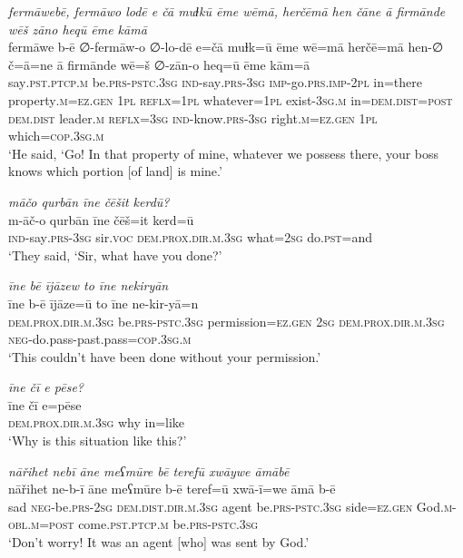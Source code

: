 \ea \label{PM.20}
\textit{fermāwebē, fermāwo lodē e čā muɫkū ēme wēmā, herčēmā hen čāne ā firmānde wēš zāno heqū ēme kāmā} \\ 
\gll fermāwe b-ē ∅-fermāw-o ∅-lo-dē e=čā muɫk=ū ēme wē=mā herčē=mā hen-∅ č=ā=ne ā firmānde wē=š ∅-zān-o heq=ū ēme kām=ā \\ 
 say\textsc{.pst}\textsc{.ptcp}\textsc{.m} be\textsc{.prs}\textsc{-pstc}\textsc{.3sg} \textsc{ind-}say\textsc{.prs}\textsc{-3sg} \textsc{imp-}go\textsc{.prs}.\textsc{imp-}\textsc{2pl} in=there property\textsc{.m}\textsc{\textsc{=ez.gen}} \textsc{1pl} \textsc{reflx}\textsc{=1pl} whatever\textsc{=1pl} exist\textsc{-3sg}\textsc{.m} in=\textsc{dem.dist}\textsc{=\textsc{post}} \textsc{dem.dist} leader\textsc{.m} \textsc{reflx}\textsc{=3sg} \textsc{ind-}know\textsc{.prs}\textsc{-3sg} right\textsc{.m}\textsc{\textsc{=ez.gen}} \textsc{1pl} which\textsc{=cop}\textsc{.3sg}\textsc{.m} \\ 
\glt `He said, ‘Go! In that property of mine, whatever we possess there, your boss knows which portion [of land] is mine.'
\z 
 
\ea \label{PM.29}
\textit{māčo qurbān īne čēšit kerdū?} \\ 
\gll m-āč-o qurbān īne čēš=it kerd=ū \\ 
 \textsc{ind-}say\textsc{.prs}\textsc{-3sg} sir.\textsc{voc} \textsc{dem.prox}\textsc{.dir}\textsc{.m}\textsc{.3sg} what\textsc{=\textsc{2sg}} do\textsc{.pst}=and \\ 
\glt `They said, ‘Sir, what have you done?'
\z 
 
\ea \label{PM.30}
\textit{īne bē ījāzew to īne nekiryān} \\ 
\gll īne b-ē ījāze=ū to īne ne-kir-yā=n \\ 
 \textsc{dem.prox}\textsc{.dir}\textsc{.m}\textsc{.3sg} be\textsc{.prs}\textsc{-pstc}\textsc{.3sg} permission\textsc{\textsc{=ez.gen}} \textsc{2sg} \textsc{dem.prox}\textsc{.dir}\textsc{.m}\textsc{.3sg} \textsc{neg-}do.pass-past.pass\textsc{=cop}\textsc{.3sg}\textsc{.m} \\ 
\glt `This couldn’t have been done without your permission.'
\z 
 
\ea \label{PM.32}
\textit{īne čī e pēse?} \\ 
\gll īne čī e=pēse \\ 
 \textsc{dem.prox}\textsc{.dir}\textsc{.m}\textsc{.3sg} why in=like \\ 
\glt `Why is this situation like this?'
\z 
 
\ea \label{PM.34}
\textit{nāřihet nebī āne meʕmūre bē terefū xwāywe āmābē} \\ 
\gll nāřihet ne-b-ī āne meʕmūre b-ē teref=ū xwā-ī=we āmā b-ē \\ 
 sad \textsc{neg-}be\textsc{.prs}-\textsc{2sg} \textsc{dem.dist}\textsc{.dir}\textsc{.m}\textsc{.3sg} agent be\textsc{.prs}\textsc{-pstc}\textsc{.3sg} side\textsc{\textsc{=ez.gen}} God\textsc{.m}\textsc{-obl}\textsc{.m}\textsc{=\textsc{post}} come\textsc{.pst}\textsc{.ptcp}\textsc{.m} be\textsc{.prs}\textsc{-pstc}\textsc{.3sg} \\ 
\glt `Don’t worry! It was an agent [who] was sent  by God.'
\z 
 
